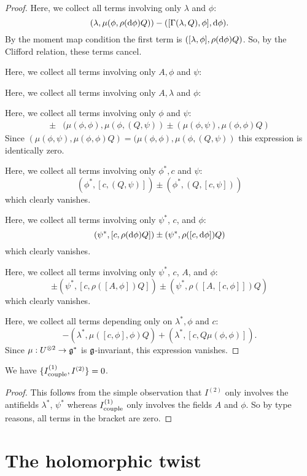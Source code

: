 \documentclass[10pt, oneside]{article}
\begin{document}
\begin{proof}
Here, we collect all terms involving only $\lambda$ and $\phi$:
\[
(\lambda, \mu( \phi, \rho({\rm d} \phi)Q)) - ([\Gamma(\lambda, Q), \phi], {\rm d} \phi). 
\]
By the moment map condition the first term is $([\lambda, \phi], \rho({\rm d} \phi) Q)$. 
So, by the Clifford relation, these terms cancel. 

Here, we collect all terms involving only $A, \phi$ and $\psi$:

Here, we collect all terms involving only $A, \lambda$ and $\phi$:

Here, we collect all terms involving only $\phi$ and $\psi$:
\begin{align*}
\pm & (\mu(\phi, \phi) , \mu(\phi, (Q, \psi)) \pm (\mu(\phi, \psi), \mu(\phi,\phi)Q)
\end{align*}
Since $(\mu(\phi, \psi), \mu(\phi,\phi)Q) = (\mu(\phi, \phi) , \mu(\phi, (Q, \psi))$ this expression is identically zero. 

Here, we collect all terms involving only $\phi^*, c$ and $\psi$:
\[
(\phi^*, [c, (Q, \psi)]) \pm (\phi^*, (Q, [c,\psi])) 
\]
which clearly vanishes. 

Here, we collect all terms involving only $\psi^*$, $c$, and $\phi$:
\[
(\psi^*, [c, \rho({\rm d} \phi) Q]) \pm (\psi^*, \rho( [c ,{\rm d} \phi ]) Q) 
\]
which clearly vanishes. 

Here, we collect all terms involving only $\psi^*$, $c$, $A$, and $\phi$:
\[
\pm (\psi^*, [c, \rho([A,\phi]) Q]) \pm (\psi^*, \rho([A,[c,\phi]]) Q) 
\]
which clearly vanishes. 

Here, we collect all terms depending only on $\lambda^*, \phi$ and $c$:
\[
- (\lambda^*, \mu([c, \phi], \phi) Q) + (\lambda^*, [c, Q \mu(\phi,\phi)]) .
\]
Since $\mu : U^{\otimes 2} \to \mathfrak g^*$ is $\mathfrak g$-invariant, this expression vanishes. 
\end{proof}


\begin{lem} 
We have $\{I_{\rm couple}^{(1)}, I^{(2)}\} = 0$. 
\end{lem}
\begin{proof}
This follows from the simple observation that $I^{(2)}$ only involves the antifields $\lambda^*$, $\psi^*$ whereas $I^{(1)}_{\rm couple}$ only involves the fields $A$ and $\phi$.
So by type reasons, all terms in the bracket are zero.
\end{proof}

\section{The holomorphic twist}
\end{document}
